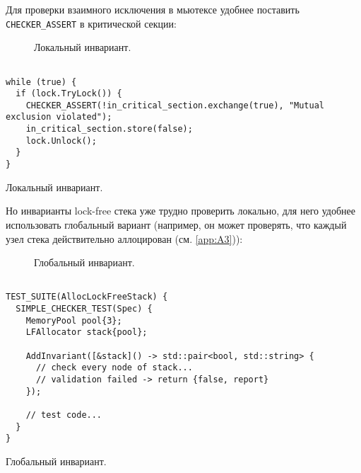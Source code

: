 Для проверки взаимного исключения в мьютексе удобнее поставить \texttt{CHECKER_ASSERT} в критической секции: 


\begin{figure}
	\bigskip
	\caption{Локальный инвариант.}
\end{figure}

\else

\begin{listing}
	\centering
	
	\begin{verbatim}
    
while (true) {
  if (lock.TryLock()) {
    CHECKER_ASSERT(!in_critical_section.exchange(true), "Mutual exclusion violated");
    in_critical_section.store(false);
    lock.Unlock();
  }
}

	\end{verbatim}
	\caption{Локальный инвариант.}
	\label{local}
\end{listing}

\fi

Но инварианты lock-free стека уже трудно проверить локально, для него удобнее использовать глобальный вариант (например, он может проверять, что каждый узел стека действительно аллоцирован (см. \ref{app:A3})):


\begin{figure}
	\bigskip
	\caption{Глобальный инвариант.}
\end{figure}

\else

\begin{listing}
	\centering
	
	\begin{verbatim}

TEST_SUITE(AllocLockFreeStack) {
  SIMPLE_CHECKER_TEST(Spec) {
    MemoryPool pool{3};
    LFAllocator stack{pool};
        
    AddInvariant([&stack]() -> std::pair<bool, std::string> {
      // check every node of stack...
      // validation failed -> return {false, report}
    });
	
    // test code...
  }
}
	\end{verbatim}
	\caption{Глобальный инвариант.}
	\label{localinv}
\end{listing}


